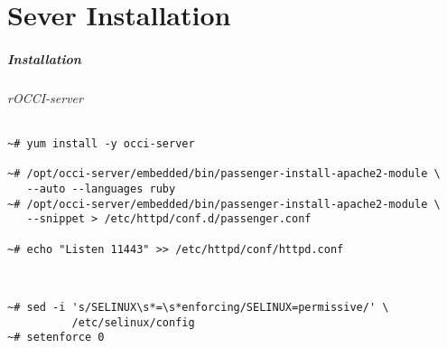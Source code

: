 \part{Sever Installation}

\begin{frame}[fragile]
  \frametitle{Installation}
  \framesubtitle{rOCCI-server}

  \begin{Sbox}
  \Fonttiny
  \begin{minipage}{\linewidth-2\fboxsep-2\fboxrule-4pt}
  \color{white}
  \begin{verbatim}
~# yum install -y occi-server

~# /opt/occi-server/embedded/bin/passenger-install-apache2-module \
   --auto --languages ruby
~# /opt/occi-server/embedded/bin/passenger-install-apache2-module \
   --snippet > /etc/httpd/conf.d/passenger.conf

~# echo "Listen 11443" >> /etc/httpd/conf/httpd.conf
  \end{verbatim}
  \end{minipage}
  \end{Sbox}

  \hfill\\

  \begin{Sbox}
  \Fonttiny
  \begin{minipage}{\linewidth-2\fboxsep-2\fboxrule-4pt}
  \color{white}
  \begin{verbatim}
~# sed -i 's/SELINUX\s*=\s*enforcing/SELINUX=permissive/' \
          /etc/selinux/config
~# setenforce 0
  \end{verbatim}
  \end{minipage}
  \end{Sbox}
\end{frame}

